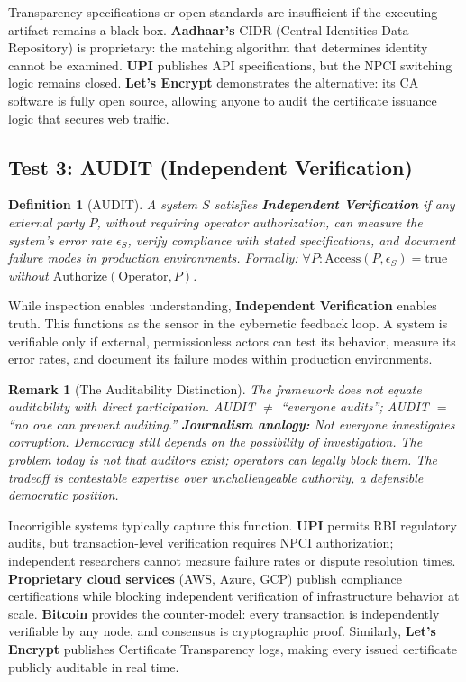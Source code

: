 \documentclass{article}
\newtheorem{definition}{Definition}
\newtheorem{remark}{Remark}
\begin{document}
Transparency specifications or open standards are insufficient if the executing artifact remains a black box. \textbf{Aadhaar's} CIDR (Central Identities Data Repository) is proprietary: the matching algorithm that determines identity cannot be examined. \textbf{UPI} publishes API specifications, but the NPCI switching logic remains closed. \textbf{Let's Encrypt} demonstrates the alternative: its CA software is fully open source, allowing anyone to audit the certificate issuance logic that secures web traffic.

\subsection{Test 3: AUDIT (Independent Verification)}

\begin{definition}[AUDIT]
\label{def:audit}
A system $S$ satisfies \textbf{Independent Verification} if any external party $P$, without requiring operator authorization, can measure the system's error rate $\epsilon_S$, verify compliance with stated specifications, and document failure modes in production environments. Formally: $\forall P: \text{Access}(P, \epsilon_S) = \text{true}$ without $\text{Authorize}(\text{Operator}, P)$.
\end{definition}

While inspection enables understanding, \textbf{Independent Verification} enables truth. This functions as the sensor in the cybernetic feedback loop. A system is verifiable only if external, permissionless actors can test its behavior, measure its error rates, and document its failure modes within production environments.

\begin{remark}[The Auditability Distinction]
The framework does not equate auditability with direct participation. AUDIT $\neq$ ``everyone audits''; AUDIT $=$ ``no one can prevent auditing.'' \textbf{Journalism analogy:} Not everyone investigates corruption. Democracy still depends on the \textit{possibility} of investigation. The problem today is not that auditors exist; operators can legally block them. The tradeoff is contestable expertise over unchallengeable authority, a defensible democratic position.
\end{remark}

Incorrigible systems typically capture this function. \textbf{UPI} permits RBI regulatory audits, but transaction-level verification requires NPCI authorization; independent researchers cannot measure failure rates or dispute resolution times. \textbf{Proprietary cloud services} (AWS, Azure, GCP) publish compliance certifications while blocking independent verification of infrastructure behavior at scale. \textbf{Bitcoin} provides the counter-model: every transaction is independently verifiable by any node, and consensus is cryptographic proof. Similarly, \textbf{Let's Encrypt} publishes Certificate Transparency logs, making every issued certificate publicly auditable in real time.
\end{document}

